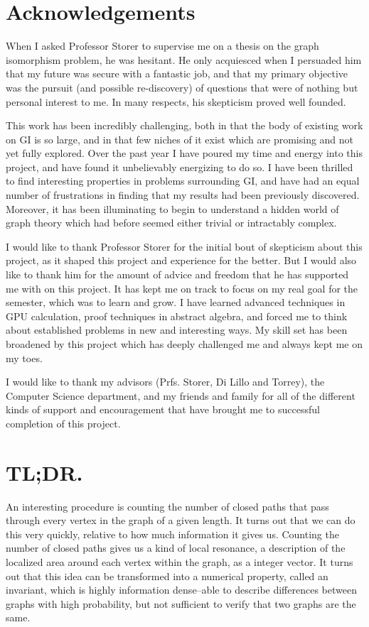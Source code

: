 \chapter*{Acknowledgements}

When I asked Professor Storer to supervise me on a thesis on the graph isomorphism problem, he was hesitant.
He only acquiesced when I persuaded him that my future was secure with a fantastic job, and that my primary objective was the pursuit (and possible re-discovery) of questions that were of nothing but personal interest to me.
In many respects, his skepticism proved well founded.

This work has been incredibly challenging, both in that the body of existing work on GI is so large, and in that few niches of it exist which are promising and not yet fully explored.
Over the past year I have poured my time and energy into this project, and have found it unbelievably energizing to do so.
I have been thrilled to find interesting properties in problems surrounding GI, and have had an equal number of frustrations in finding that my results had been previously discovered.
Moreover, it has been illuminating to begin to understand a hidden world of graph theory which had before seemed either trivial or intractably complex.

I would like to thank Professor Storer for the initial bout of skepticism about this project, as it shaped this project and experience for the better.
But I would also like to thank him for the amount of advice and freedom that he has supported me with on this project.
It has kept me on track to focus on my real goal for the semester, which was to learn and grow.
I have learned advanced techniques in GPU calculation, proof techniques in abstract algebra, and forced me to think about established problems in new and interesting ways.
My skill set has been broadened by this project which has deeply challenged me and always kept me on my toes.

I would like to thank my advisors (Prfs. Storer, Di Lillo and Torrey), the Computer Science department, and my friends and family for all of the different kinds of support and encouragement that have brought me to successful completion of this project.

\chapter*{TL;DR.}

An interesting procedure is counting the number of closed paths that pass through every vertex in the graph of a given length.
It turns out that we can do this very quickly, relative to how much information it gives us.
Counting the number of closed paths gives us a kind of local resonance, a description of the localized area around each vertex within the graph, as a integer vector. 
It turns out that this idea can be transformed into a numerical property, called an invariant, which is highly information dense--able to describe differences between graphs with high probability, but not sufficient to verify that two graphs are the same.


